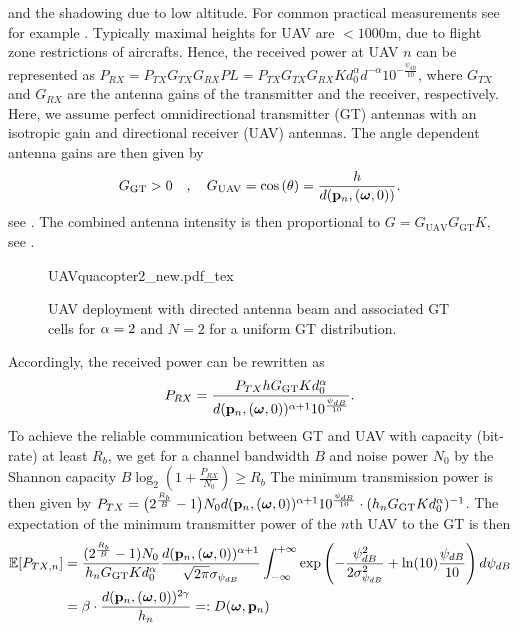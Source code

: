 \documentclass[smallabstract,smallcaptions]{dccpaper}
\newcounter{example}[section]
\renewcommand{\vq}{\mathbf p}
\newcommand{\Rb}{\ensuremath{R_b}}         %
\newcommand{\GGT}{\ensuremath{G_{\text{GT}}}}         %
\newcommand{\GUAV}{\ensuremath{G_{\text{UAV}}}}         %
\newcommand{\Dis}{\ensuremath{D}}                    %
\begin{document}
%
and the shadowing due to low altitude.  For common practical measurements see for example \cite{AG18}.  Typically
maximal heights for UAV are $<1000$m, due to flight zone restrictions of aircrafts.  Hence, the received power at
UAV $n$ can be represented as
%
$P_{RX}=P_{TX}G_{TX}G_{RX}PL=P_{TX}G_{TX}G_{RX}Kd^{\alpha}_0 d^{-\alpha}10^{-\frac{\psi_{dB}}{10}}$,
%
where $G_{TX}$ and $G_{RX}$ are the antenna gains of the transmitter and the receiver, respectively. Here, we assume
perfect omnidirectional transmitter (GT) antennas with an isotropic gain and directional receiver (UAV) antennas.  The
angle dependent antenna gains are then given by 
%
\begin{equation}
\GGT >0\quad,\quad
  \GUAV = \cos\left(\theta\right)=\frac{h}{d(\vq_n,(\vome,0))}.
\label{eq:Gdirected}
\end{equation}
%
see \cite[pp.52]{Bal05a}. The combined antenna intensity is then proportional to
%
$G=\GUAV \GGT K$, see .
%
\begin{figure}
  \centering
  \def\svgwidth{.9\textwidth} \scriptsize{
    {UAVquacopter2_new.pdf_tex}}
    \caption{UAV deployment with directed antenna beam and associated GT cells for $\alpha=2$ and $N=2$ for a uniform GT distribution.}
    \label{fig:uavdirected}
\end{figure}
%
Accordingly, the received power can be rewritten as
%
\begin{equation}
  P_{RX}=\frac{P_{TX}h \GGT K d^{\alpha}_0}{d(\vq_n,(\vome,0))^{\alpha+1}10^{\frac{\psi_{dB}}{10}}}.
\end{equation}
%
To achieve the reliable communication between GT and UAV with capacity (bit-rate) at least $\Rb$, we get for a
channel bandwidth $B$  and noise power $N_0$ by the Shannon capacity 
$B\log_2\left(1+\frac{P_{RX}}{N_0}\right)\ge\Rb$
The minimum transmission power is then given by
$P_{TX}=\big(2^{\frac{\Rb}{B}}-1\big)N_0d(\vq_n,(\vome,0))^{\alpha+1}10^{\frac{\psi_{dB}}{10}} \cdot  (h_n \GGT
Kd^{\alpha}_0)^{-1}$.
%
%
The expectation of the minimum transmitter power of the $n$th UAV to the GT is then 
%
\begin{align}
  \Expect{P_{TX,n}}& =
  \frac{(2^{\frac{\Rb}{B}}-1)N_0 }{ h_n \GGT Kd^{\alpha}_0}
   \frac{d(\vq_n,(\vome,0))^{\alpha+1}}{\sqrt{2\pi}\sigma_{\psi_{dB}}} \int_{-\infty}^{+\infty}
     \exp\left(-\frac{\psi^2_{dB}}{2\sigma^2_{\psi_{dB}}}+ \ln(10) \frac{\psi_{dB}}{10}\right)d\psi_{dB}\notag\\
  &=\bet \cdot  \frac{d( \vq_n,(\vome,0))^{2\gam}}{h_n}=:\Dis(\vome,\vq_n) \label{eq:Eptx}
\end{align}
\end{document}
